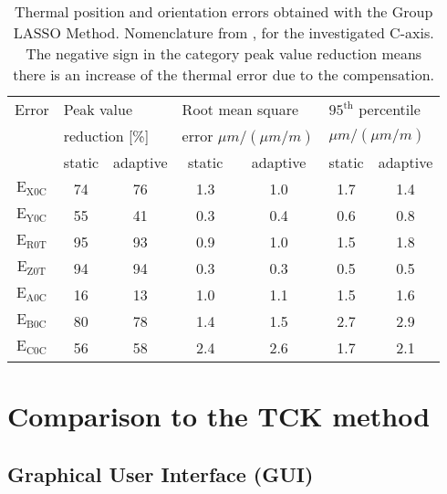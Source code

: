 \begin{table}[!htb]
\centering
\begin{threeparttable}
\caption[Statistical evaluation of the data and comparison of the methods - static vs. adaptive]{Thermal position and orientation errors obtained with the Group LASSO Method.  Nomenclature from \cite{Blaser_2017}, for the investigated C-axis. The negative sign in the category peak value reduction means there is an increase of the thermal error due to the compensation.}
\begin{tabular}{c c c c c c c}
\hline
Error  & \multicolumn{2}{l}{Peak value} \hspace{2cm} & \multicolumn{2}{l}{Root mean square} \hspace{2cm} & \multicolumn{2}{l}{$\mathrm{95^{th}}$ percentile} \vspace{-0.2cm} \\
 & \multicolumn{2}{l}{reduction [\%]} & \multicolumn{2}{l}{error $\mu m / (\mu m / m)$} & \multicolumn{2}{l}{$\mu m / (\mu m / m)$} \\
\hline
  & static & adaptive & static & adaptive & static & adaptive \\
  \hline \vspace{-0.2cm}
 $\mathrm{E_{X0C}}$ & 74 & 76 & 1.3 & 1.0 & 1.7 & 1.4 \\ \vspace{-0.2cm}
 $\mathrm{E_{Y0C}}$ & 55 & 41 & 0.3 & 0.4 & 0.6 & 0.8 \\ \vspace{-0.2cm}
 $\mathrm{E_{R0T}}$ & 95 & 93 & 0.9 & 1.0 & 1.5 & 1.8 \\ \vspace{-0.2cm}
 $\mathrm{E_{Z0T}}$ & 94 & 94 & 0.3 & 0.3 & 0.5 &  0.5\\ \vspace{-0.2cm}
 $\mathrm{E_{A0C}}$ & 16 & 13 & 1.0 & 1.1 & 1.5 & 1.6 \\ \vspace{-0.2cm}
 $\mathrm{E_{B0C}}$ & 80 & 78 & 1.4 & 1.5 & 2.7 & 2.9 \\ 
 $\mathrm{E_{C0C}}$ & 56 & 58 & 2.4 & 2.6 & 1.7 & 2.1 \\
\hline
\end{tabular}
\label{Tab:statistic_GL}
\end{threeparttable}
\end{table}


\section{Comparison to the TCK method}
\label{sec:comparisonTCK}

\subsection{Graphical User Interface (GUI)}
\label{sec:graphical_user_interface}

\